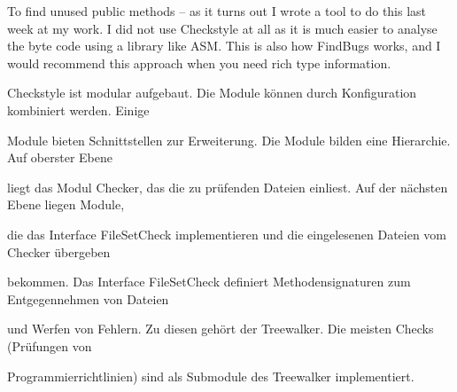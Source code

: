 To find unused public methods -- as it turns out I wrote a tool to do this last week at my work. I did not use Checkstyle at all as it is much easier to analyse the byte code using a library like ASM. This is also how FindBugs works, and I would recommend this approach when you need rich type information. 


Checkstyle ist modular aufgebaut. Die Module können durch Konfiguration kombiniert werden. Einige 

Module bieten Schnittstellen zur Erweiterung. Die Module bilden eine Hierarchie. Auf oberster Ebene 

liegt das Modul Checker, das die zu prüfenden Dateien einliest. Auf der nächsten Ebene liegen Module, 

die das Interface FileSetCheck implementieren und die eingelesenen Dateien vom Checker übergeben 

bekommen. Das Interface FileSetCheck definiert Methodensignaturen zum Entgegennehmen von Dateien 

und Werfen von Fehlern. Zu diesen gehört der Treewalker. Die meisten Checks (Prüfungen von 

Programmierrichtlinien) sind als Submodule des Treewalker implementiert.



